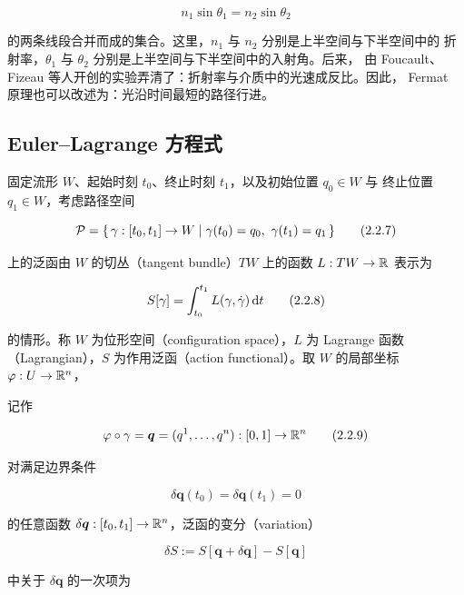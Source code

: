 \begin{equation}
  n_1\sin\theta_1 = n_2\sin\theta_2
  \tag{2.2.6}
\end{equation}

的两条线段合并而成的集合。这里，$n_1$ 与 $n_2$ 分别是上半空间与下半空间中的
折射率，$\theta_1$ 与 $\theta_2$ 分别是上半空间与下半空间中的入射角。后来，
由 Foucault、Fizeau 等人开创的实验弄清了：折射率与介质中的光速成反比。因此，
Fermat 原理也可以改述为：光沿时间最短的路径行进。

\subsection{Euler--Lagrange 方程式}

固定流形 $W$、起始时刻 $t_0$、终止时刻 $t_1$，以及初始位置 $q_0\in W$ 与
终止位置 $q_1\in W$，考虑路径空间

\begin{equation}
  \mathcal{P} = \{\,\gamma:[t_0,t_1]\to W \mid \gamma(t_0)=q_0,\ \gamma(t_1)=q_1\,\}
  \tag{2.2.7}
\end{equation}

上的泛函由 $W$ 的切丛（tangent bundle）$TW$ 上的函数
$L:TW\to\mathbb{R}$ 表示为

\begin{equation}
  S[\gamma] = \int_{t_0}^{t_1} L(\gamma,\dot\gamma)\,\mathrm{d} t
  \tag{2.2.8}
\end{equation}

的情形。称 $W$ 为位形空间（configuration space），$L$ 为 Lagrange 函数
（Lagrangian），$S$ 为作用泛函（action functional）。取 $W$ 的局部坐标
$\varphi:U\to\mathbb{R}^n$，

记作

\begin{equation}
  \varphi\circ\gamma
    = \bm{q} = (q^1,\dots,q^n) : [0,1] \to \mathbb{R}^n
  \tag{2.2.9}
\end{equation}

对满足边界条件

\begin{equation}
  \delta\bm{q}(t_0) = \delta\bm{q}(t_1) = 0
  \tag{2.2.10}
\end{equation}

的任意函数 $\delta\bm{q}:[t_0,t_1]\to\mathbb{R}^n$，泛函的变分（variation）

\begin{equation}
  \delta S := S[\bm{q} + \delta\bm{q}] - S[\bm{q}]
  \tag{2.2.11}
\end{equation}

中关于 $\delta\bm{q}$ 的一次项为


